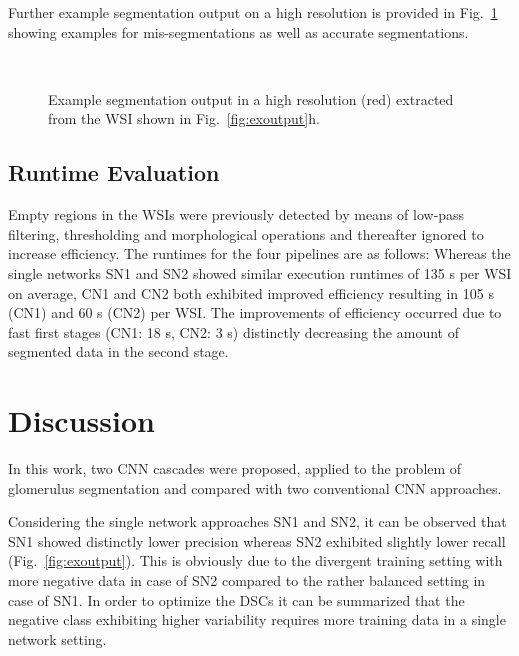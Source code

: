 \documentclass{elsarticle}
\begin{document}
%
Further example segmentation output on a high resolution is provided in Fig.~\ref{fig:exoutput2} showing examples for mis-segmentations as well as accurate segmentations.
\begin{figure} \center
		\\
		 $\;$
	\caption{Example segmentation output in a high resolution (red) extracted from the WSI shown in Fig.~\ref{fig:exoutput}h.}
	\label{fig:exoutput2}
\end{figure}


\subsection{Runtime Evaluation}
Empty regions in the WSIs were previously detected by means of low-pass filtering, thresholding and morphological operations and thereafter ignored to increase efficiency.
The runtimes for the four pipelines are as follows: Whereas the single networks SN1 and SN2 showed similar execution runtimes of 135 s per WSI on average, CN1 and CN2 both exhibited improved efficiency resulting in 105 s (CN1) and 60 s (CN2) per WSI. The improvements of efficiency occurred due to fast first stages (CN1: 18 s, CN2: 3 s) distinctly decreasing the amount of segmented data in the second stage.


\section{Discussion}

In this work, two CNN cascades were proposed, applied to the problem of glomerulus segmentation and compared with two conventional CNN approaches.

Considering the single network approaches SN1 and SN2, it can be observed that SN1 showed distinctly lower precision whereas SN2 exhibited slightly lower recall (Fig.~\ref{fig:exoutput}). This is obviously due to the divergent training setting with more negative data in case of SN2 compared to the rather balanced setting in case of SN1. In order to optimize the DSCs it can be summarized that the negative class exhibiting higher variability requires more training data in a single network setting.
\end{document}
